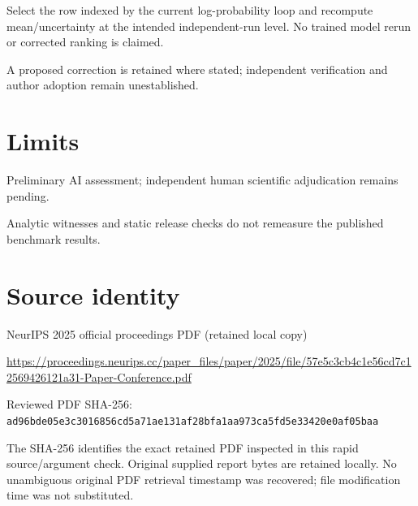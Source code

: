 \documentclass[11pt]{article}
\begin{document}
Select the row indexed by the current log-probability loop and recompute mean/uncertainty at the intended independent-run level. No trained model rerun or corrected ranking is claimed.

A proposed correction is retained where stated; independent verification and author adoption remain unestablished.

\section*{Limits}

Preliminary AI assessment; independent human scientific adjudication remains pending.\par

Analytic witnesses and static release checks do not remeasure the published benchmark results.\par

\section*{Source identity}

NeurIPS 2025 official proceedings PDF (retained local copy)

\url{https://proceedings.neurips.cc/paper_files/paper/2025/file/57e5c3cb4c1e56cd7c12569426121a31-Paper-Conference.pdf}

Reviewed PDF SHA-256: \nolinkurl{ad96bde05e3c3016856cd5a71ae131af28bfa1aa973ca5fd5e33420e0af05baa}

The SHA-256 identifies the exact retained PDF inspected in this rapid source/argument check. Original supplied report bytes are retained locally. No unambiguous original PDF retrieval timestamp was recovered; file modification time was not substituted.
\end{document}
